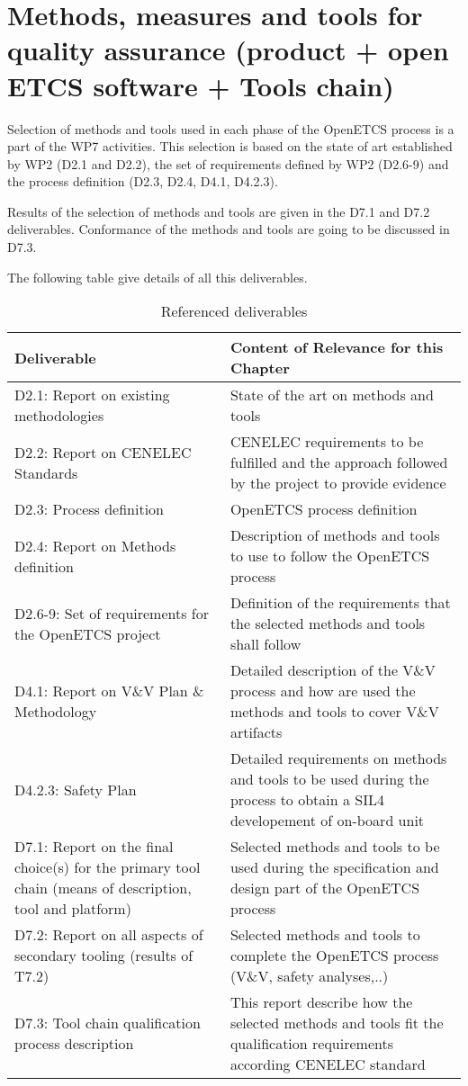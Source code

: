 \documentclass{template/openetcs_article}
\begin{document}
\section{Methods, measures and tools for quality assurance (product + open ETCS software + Tools chain)}


Selection of methods and tools used in each phase of the OpenETCS process is a part of the WP7 activities. This selection is based on the state of art established by WP2 (D2.1 and D2.2), the set of requirements defined by WP2 (D2.6-9) and the process definition (D2.3, D2.4, D4.1, D4.2.3).

Results of the selection of methods and tools are given in the D7.1 and D7.2 deliverables. Conformance of the methods and tools are going to be discussed in D7.3.

The following table give details of all this deliverables.

\begin{table}[H]
\begin{supertabular}{|m{3cm}|m{11cm}|}
\hline
{}
Deliverable &
Content of Relevance for this Chapter\\\hline
D2.1: Report on existing methodologies &
State of the art on methods and tools \\\hline
D2.2: Report on CENELEC Standards &
CENELEC requirements to be fulfilled and the approach followed by the project to provide evidence\\\hline
D2.3: Process definition &
OpenETCS process definition \\\hline
D2.4: Report on Methods definition &
Description of methods and tools to use to follow the OpenETCS process \\\hline
D2.6-9: Set of requirements for the OpenETCS project &
Definition of the requirements that the selected methods and tools shall follow \\\hline
D4.1: Report on V\&V Plan \& Methodology &
Detailed description of the V\&V process and how are used the methods and tools to cover V\&V artifacts \\\hline
D4.2.3: Safety Plan &
Detailed requirements on methods and tools to be used during the process to obtain a SIL4 developement of on-board unit \\\hline
D7.1: Report on the final choice(s) for the primary tool chain (means of description, tool and platform) &
Selected methods and tools to be used during the specification and design part of the OpenETCS process \\\hline
D7.2: Report on all aspects of secondary tooling (results of T7.2)  &
Selected methods and tools to complete the OpenETCS process (V\&V, safety analyses,..) \\\hline
D7.3: Tool chain qualification process description &
This report describe how the selected methods and tools fit the qualification requirements according CENELEC standard \\\hline
\end{supertabular}
\caption{Referenced deliverables}
\end{table}
\end{document}
